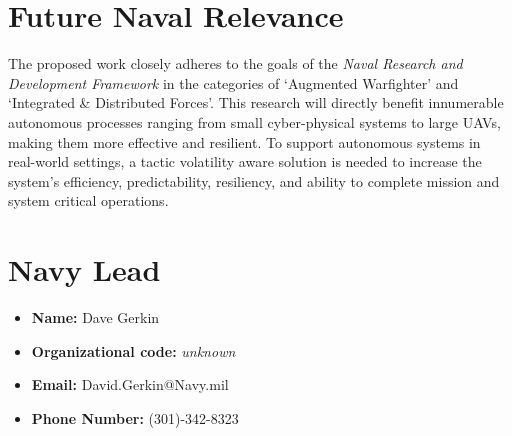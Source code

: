 \documentclass[12pt]{article}
\newcommand{\dan}[1]{\textcolor{blue}{{\it [Dan: #1]}}}
\begin{document}


 



\vspace{-8mm}
\section{Future Naval Relevance}
\vspace{-2mm}


The proposed work closely adheres to the goals of the \emph{Naval Research and Development Framework} in the categories of `Augmented Warfighter' and `Integrated \& Distributed Forces'. This research will directly benefit innumerable autonomous processes ranging from small cyber-physical systems to large UAVs, making them more effective and resilient. To support autonomous systems in real-world settings, a tactic volatility aware solution is needed to increase the system's efficiency, predictability, resiliency, and ability to complete mission and system critical operations. 

\vspace{-5mm}
\section{Navy Lead}
\vspace{-6mm}





    \begin{multicols}{2}
    \begin{itemize}[noitemsep]
        \item \textbf{Name: }Dave Gerkin 
        \item \textbf{Organizational code: }\emph{unknown}%
        \item \textbf{Email: }David.Gerkin@Navy.mil
        \item \textbf{Phone Number: }(301)-342-8323

    \end{itemize}
    \end{multicols}
\end{document}
